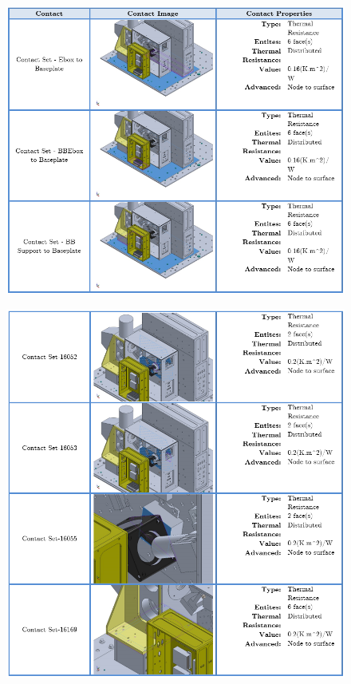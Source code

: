 \begin{figure}
    \centering
    \includegraphics[width=\textwidth]{thermal_load_images/ascent_pt2_TL_images/ascesnt_pt2_11.PNG}
\end{figure}

\begin{figure}
    \centering
    \includegraphics[width=\textwidth]{thermal_load_images/ascent_pt2_TL_images/ascesnt_pt2_12.PNG}
\end{figure}


